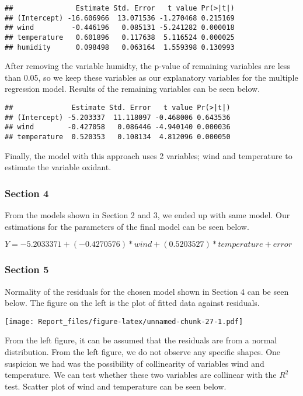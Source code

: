 \documentclass[]{article}
\begin{document}
\begin{verbatim}
##               Estimate Std. Error   t value Pr(>|t|)
## (Intercept) -16.606966  13.071536 -1.270468 0.215169
## wind         -0.446196   0.085131 -5.241282 0.000018
## temperature   0.601896   0.117638  5.116524 0.000025
## humidity      0.098498   0.063164  1.559398 0.130993
\end{verbatim}

After removing the variable humidty, the p-value of remaining variables
are less than 0.05, so we keep these variables as our explanatory
variables for the multiple regression model. Results of the remaining
variables can be seen below.

\begin{verbatim}
##              Estimate Std. Error   t value Pr(>|t|)
## (Intercept) -5.203337  11.118097 -0.468006 0.643536
## wind        -0.427058   0.086446 -4.940140 0.000036
## temperature  0.520353   0.108134  4.812096 0.000050
\end{verbatim}

Finally, the model with this approach uses 2 variables; wind and
temperature to estimate the variable oxidant.

\subsubsection{Section 4}\label{section-4-3}

From the models shown in Section 2 and 3, we ended up with same model.
Our estimations for the parameters of the final model can be seen below.

\(Y = -5.2033371 + (-0.4270576) * wind + (0.5203527) * temperature + error\)

\subsubsection{Section 5}\label{section-5}

Normality of the residuals for the chosen model shown in Section 4 can
be seen below. The figure on the left is the plot of fitted data against
residuals.

\texttt{[image: Report\_files/figure-latex/unnamed-chunk-27-1.pdf]}

From the left figure, it can be assumed that the residuals are from a
normal distribution. From the left figure, we do not observe any
specific shapes. One suspicion we had was the possibility of
collinearity of variables wind and temperature. We can test whether
these two variables are collinear with the \(R^2\) test. Scatter plot of
wind and temperature can be seen below.
\end{document}
